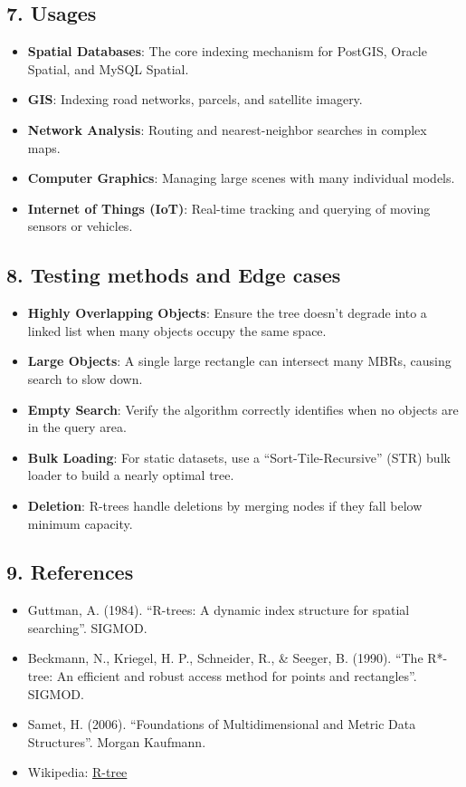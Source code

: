 \subsection{7. Usages}
\begin{itemize}
    \item \textbf{Spatial Databases}: The core indexing mechanism for PostGIS, Oracle Spatial, and MySQL Spatial.
    \item \textbf{GIS}: Indexing road networks, parcels, and satellite imagery.
    \item \textbf{Network Analysis}: Routing and nearest-neighbor searches in complex maps.
    \item \textbf{Computer Graphics}: Managing large scenes with many individual models.
    \item \textbf{Internet of Things (IoT)}: Real-time tracking and querying of moving sensors or vehicles.
\end{itemize}

\subsection{8. Testing methods and Edge cases}
\begin{itemize}
    \item \textbf{Highly Overlapping Objects}: Ensure the tree doesn't degrade into a linked list when many objects occupy the same space.
    \item \textbf{Large Objects}: A single large rectangle can intersect many MBRs, causing search to slow down.
    \item \textbf{Empty Search}: Verify the algorithm correctly identifies when no objects are in the query area.
    \item \textbf{Bulk Loading}: For static datasets, use a ``Sort-Tile-Recursive'' (STR) bulk loader to build a nearly optimal tree.
    \item \textbf{Deletion}: R-trees handle deletions by merging nodes if they fall below minimum capacity.
\end{itemize}

\subsection{9. References}
\begin{itemize}
    \item Guttman, A. (1984). ``R-trees: A dynamic index structure for spatial searching''. SIGMOD.
    \item Beckmann, N., Kriegel, H. P., Schneider, R., \& Seeger, B. (1990). ``The R*-tree: An efficient and robust access method for points and rectangles''. SIGMOD.
    \item Samet, H. (2006). ``Foundations of Multidimensional and Metric Data Structures''. Morgan Kaufmann.
    \item Wikipedia: \href{https://en.wikipedia.org/wiki/R-tree}{R-tree}
\end{itemize}

